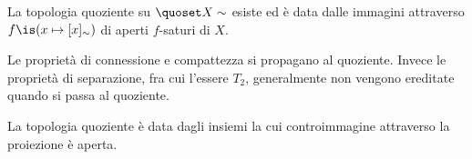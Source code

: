 \begin{fat}
	La topologia quoziente su $\quoset X\sim$ esiste
	ed è data dalle immagini attraverso $f\is(x\mapsto[x]_\sim)$ di aperti $f$-saturi di $X$.
\end{fat}

\begin{fat}
	Le proprietà di connessione e compattezza si propagano al quoziente. Invece le proprietà di separazione, fra cui l'essere $T_2$, generalmente non vengono ereditate quando si passa al quoziente.
\end{fat}

\begin{ex}
	La topologia quoziente è data dagli insiemi la cui controimmagine attraverso la proiezione è aperta.
\end{ex}

%
%
%
%
%
